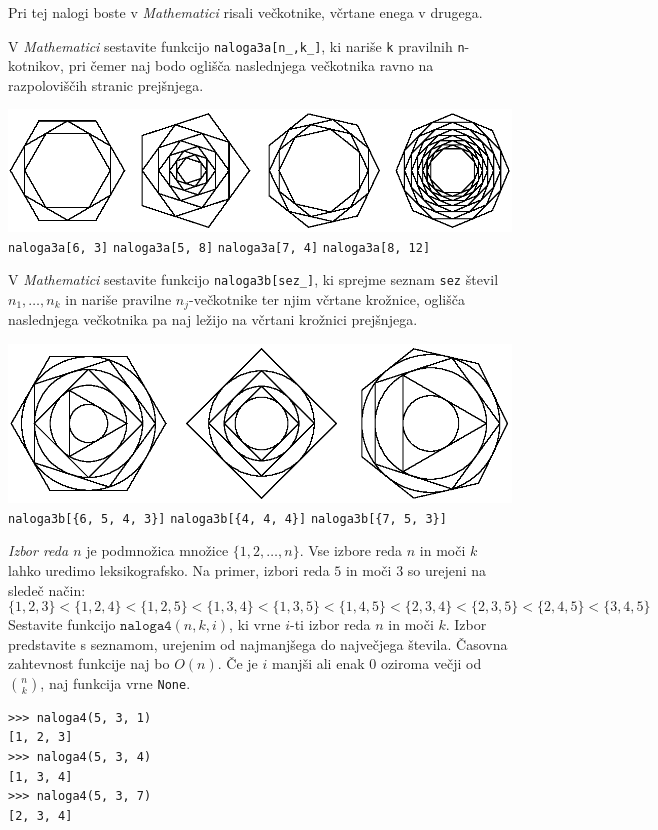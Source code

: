 \documentclass[arhiv]{izpit}
\begin{document}
\naloga[30 točk]
Pri tej nalogi boste v \emph{Mathematici} risali večkotnike, včrtane enega v drugega.

\podnaloga[20 točk]
V \emph{Mathematici} sestavite funkcijo \verb|naloga3a[n_,k_]|, ki nariše \verb|k|
pravilnih \verb|n|-kotnikov, pri čemer naj bodo oglišča naslednjega večkotnika ravno na razpoloviščih stranic prejšnjega.

\begin{center}
  \includegraphics[width=\textwidth]{naloga3a.eps} \\
  \quad  \verb|naloga3a[6, 3]|\hfill
  \verb|naloga3a[5, 8]|\hfill
  \verb|naloga3a[7, 4]|\hfill
  \verb|naloga3a[8, 12]|\hfill
\end{center}

\podnaloga[10 točk]
V \emph{Mathematici} sestavite funkcijo \verb|naloga3b[sez_]|, ki sprejme seznam \verb|sez| števil $n_1, \dots, n_k$ in nariše pravilne $n_j$-večkotnike ter njim včrtane krožnice, oglišča naslednjega večkotnika pa naj ležijo na včrtani krožnici prejšnjega.

\begin{center}
  \includegraphics[width=\textwidth]{naloga3b.eps} \\
  \verb|naloga3b[{6, 5, 4, 3}]|\quad\quad\quad
  \verb|naloga3b[{4, 4, 4}]|\quad\quad\quad\quad
  \verb|naloga3b[{7, 5, 3}]|\quad
\end{center}

\naloga[25 točk]

\emph{Izbor reda $n$} je podmnožica množice $\{1, 2, \dots, n\}$.
Vse izbore reda $n$ in moči $k$ lahko uredimo leksikografsko.
Na primer, izbori reda $5$ in moči $3$ so urejeni na sledeč način:
%
\[
  \{1, 2, 3\} < \{1, 2, 4\} < \{1, 2, 5\} < \{1, 3, 4\} < \{1, 3, 5\} <
  \{1, 4, 5\} < \{2, 3, 4\} < \{2, 3, 5\} < \{2, 4, 5\} < \{3, 4, 5\}
\]
%
Sestavite funkcijo $\mathtt{naloga4}(n, k, i)$, ki vrne $i$-ti izbor reda $n$ in moči $k$.
Izbor predstavite s seznamom, urejenim od najmanjšega do največjega števila.
Časovna zahtevnost funkcije naj bo $O(n)$.
Če je $i$ manjši ali enak $0$ oziroma večji od $n \choose k$, naj funkcija vrne \verb|None|.

\begin{verbatim}
>>> naloga4(5, 3, 1)
[1, 2, 3]
>>> naloga4(5, 3, 4)
[1, 3, 4]
>>> naloga4(5, 3, 7)
[2, 3, 4]
\end{verbatim}
\end{document}
